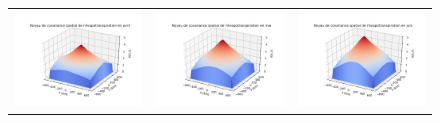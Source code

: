 \documentclass[a4paper,11pt]{article}
\numberwithin{equation}{section}
\begin{document}
\begin{figure}[H]
\begin{tabular}{ccc}
	\includegraphics[scale=0.34]{images/kernel_evap_m4.png} & \includegraphics[scale=0.34]{images/kernel_evap_m5.png} & \includegraphics[scale=0.34]{images/kernel_evap_m6.png} \\

\end{tabular}
\end{figure}
\end{document}
